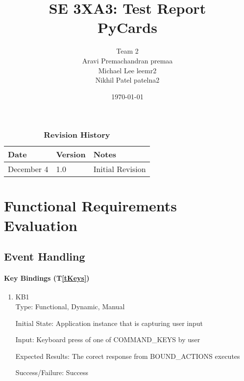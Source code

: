 \documentclass[12pt, titlepage]{article}
\title{SE 3XA3: Test Report\\PyCards}
\author{Team 2
		\\ Aravi Premachandran premaa
		\\ Michael Lee  leemr2
		\\ Nikhil Patel  patelna2
}
\date{\today}
\newcommand{\tref}[1]{T\ref{#1}}
\begin{document}
\maketitle

\tableofcontents
\listoftables
\listoffigures

\begin{table}[bp]
\caption{\bf Revision History}
\begin{tabularx}{\textwidth}{p{3cm}p{2cm}X}
\toprule {\bf Date} & {\bf Version} & {\bf Notes}\\
\midrule
December 4 & 1.0 & Initial Revision\\
\bottomrule
\end{tabularx}
\end{table}

\newpage



\section{Functional Requirements Evaluation}

	\subsection{Event Handling}
	
	\paragraph{Key Bindings (\tref{tKeys})}
	\begin{enumerate}
		\item{KB1\\}
		Type: Functional, Dynamic, Manual
		
		Initial State: Application instance that is capturing user input
		
		Input: Keyboard press of one of COMMAND\_KEYS by user
		
		Expected Results: The corect response from BOUND\_ACTIONS executes 

		Success/Failure: Success
		
	\end{enumerate}
\end{document}
